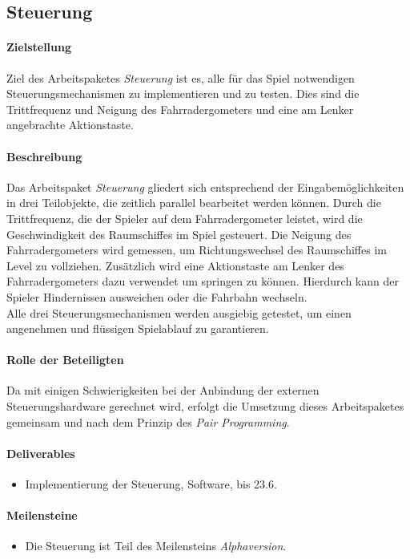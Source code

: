 \subsection{Steuerung}
\label{ap6}

\paragraph{Zielstellung}\noindent
Ziel des Arbeitspaketes \textit{Steuerung} ist es, alle für das Spiel notwendigen Steuerungsmechanismen zu implementieren und zu testen. Dies sind die Trittfrequenz und Neigung des Fahrradergometers und eine am Lenker angebrachte Aktionstaste.

\paragraph{Beschreibung}\noindent
Das Arbeitspaket \textit{Steuerung} gliedert sich entsprechend der Eingabemöglichkeiten in drei Teilobjekte, die zeitlich parallel bearbeitet werden können. Durch die Trittfrequenz, die der Spieler auf dem Fahrradergometer leistet, wird die Geschwindigkeit des Raumschiffes im Spiel gesteuert. Die Neigung des Fahrradergometers wird gemessen, um Richtungswechsel des Raumschiffes im Level zu vollziehen. Zusätzlich wird eine Aktionstaste am Lenker des Fahrradergometers dazu verwendet um springen zu können. Hierdurch kann der Spieler Hindernissen ausweichen oder die Fahrbahn wechseln.\\
Alle drei Steuerungsmechanismen werden ausgiebig getestet, um einen angenehmen und flüssigen Spielablauf zu garantieren.

\paragraph{Rolle der Beteiligten}\noindent
Da mit einigen Schwierigkeiten bei der Anbindung der externen Steuerungshardware gerechnet wird, erfolgt die Umsetzung dieses Arbeitspaketes gemeinsam und nach dem Prinzip des \textit{Pair Programming}\cite[S. 42ff]{xp}.

\paragraph{Deliverables}\noindent
\begin{itemize}
\item Implementierung der Steuerung, Software, bis 23.6.
\end{itemize}

\paragraph{Meilensteine}\noindent
\begin{itemize}
\item Die Steuerung ist Teil des Meilensteins \textit{Alphaversion}.
\end{itemize}